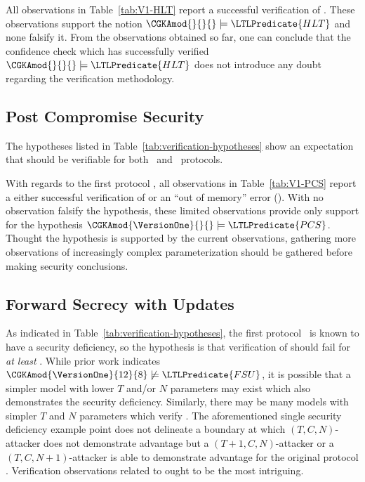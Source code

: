 All observations in Table\ \ref{tab:V1-HLT} report a successful verification of .
These observations support the notion \( \CGKAmod{}{}{} \models \LTLPredicate{HLT} \) and none falsify it.
From the observations obtained so far, one can conclude that the confidence check which has successfully verified \( \CGKAmod{}{}{} \models \LTLPredicate{HLT} \) does not introduce any doubt regarding the verification methodology.


\hypertarget{sec:post-compromise-security-results}{%
\subsection{Post Compromise Security}\label{sec:post-compromise-security-results}}

The hypotheses listed in Table\ \ref{tab:verification-hypotheses} show an expectation that  should be verifiable for both \VersionOne\ and \VersionTwo\ protocols.

With regards to the first protocol \VersionOne, all observations in Table\ \ref{tab:V1-PCS} report a either successful verification of  or an ``out of memory'' error (\OutOfMemory).
With no observation falsify the hypothesis, these limited observations provide only support for the hypothesis \( \CGKAmod{\VersionOne}{}{} \models \LTLPredicate{PCS} \).
Thought the hypothesis is supported by the current observations, gathering more observations of increasingly complex \CGKAmod{\VersionOne}{}{} parameterization should be gathered before making security conclusions.


\hypertarget{sec:forward-secrecy-results}{%
\subsection{Forward Secrecy with Updates}\label{sec:forward-secrecy-results}}

As indicated in Table\ \ref{tab:verification-hypotheses}, the first protocol \VersionOne\ is known to have a  security deficiency, so the hypothesis is that verification of  should fail for \emph{at least} .
While prior work \autocite{alwen2020security} indicates \( \CGKAmod{\VersionOne}{12}{8} \not \models \LTLPredicate{FSU} \), it is possible that a simpler model with lower \(T\) and/or \(N\) parameters may exist which also demonstrates the  security deficiency.
Similarly, there may be many  models with simpler \(T\) and \(N\) parameters which verify .
The aforementioned single  security deficiency example point does not delineate a boundary at which \((T, C, N)\)-attacker does not demonstrate advantage but a \((T+1, C, N)\)-attacker or a \((T, C, N+1)\)-attacker is able to demonstrate advantage for the original protocol \VersionOne.
Verification observations related to  ought to be the most intriguing.

